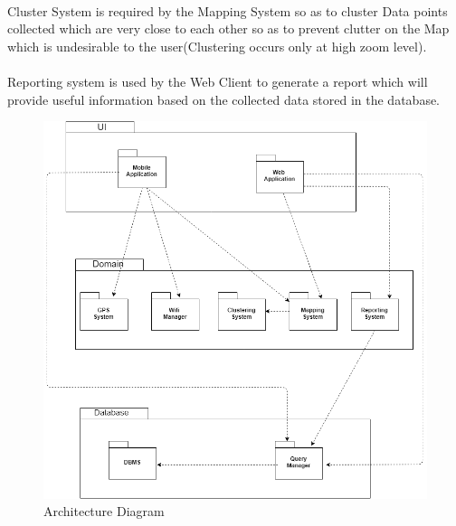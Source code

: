 \paragraph{}Cluster System is required by the Mapping System so as to cluster Data points collected which are very close to each other so as to prevent clutter on the Map which is undesirable to the user(Clustering occurs only at high zoom level).  

\paragraph{}Reporting system is used by the Web Client to generate a report which will provide useful information based on the collected data stored in the database.   
 
\begin{figure}
	\centering
	\includegraphics[width=0.7\linewidth]{images/Architecture}
	\caption{Architecture Diagram}
	\label{fig:architecture}
\end{figure}


